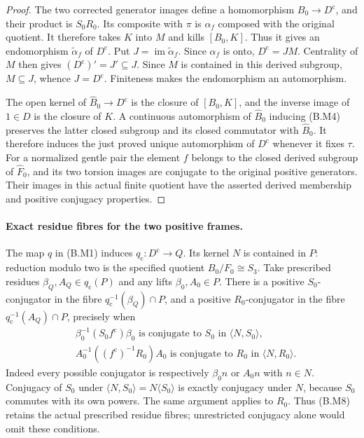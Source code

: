 \begin{proof}
The two corrected generator images define a homomorphism
$B_0\to D^{\mathrm c}$, and their product is $S_0R_0$.
Its composite with $\pi$ is $\alpha_f$ composed with the
original quotient.  It therefore takes $K$ into $M$ and
kills $[B_0,K]$.  Thus it gives an endomorphism $\widetilde
\alpha_f$ of $D^{\mathrm c}$.  Put $J=\operatorname{im}
\widetilde\alpha_f$.  Since $\alpha_f$ is onto,
$D^{\mathrm c}=JM$.  Centrality of $M$ then gives
$(D^{\mathrm c})'=J'\subseteq J$.  Since $M$ is contained
in this derived subgroup, $M\subseteq J$, whence
$J=D^{\mathrm c}$.  Finiteness makes the endomorphism an
automorphism.

The open kernel of $\widehat B_0\to D^{\mathrm c}$ is the
closure of $[B_0,K]$, and the inverse image of $1\in D$ is
the closure of $K$.  A continuous automorphism of
$\widehat B_0$ inducing (B.M4) preserves the latter closed
subgroup and its closed commutator with $\widehat B_0$.
It therefore induces the just proved unique automorphism of
$D^{\mathrm c}$ whenever it fixes $\tau$.  For a normalized
gentle pair the element $f$ belongs to the closed derived
subgroup of $\widehat F_0$, and its two torsion images are
conjugate to the original positive generators.  Their
images in this actual finite quotient have the asserted
derived membership and positive conjugacy properties.
\end{proof}

\paragraph{Exact residue fibres for the two positive frames.}
The map $q$ in (B.M1) induces $q_{\mathrm c}:D^{\mathrm c}
\to Q$.  Its kernel $N$ is contained in $P$: reduction
modulo two is the specified quotient $B_0/F_0\cong S_3$.
Take prescribed residues $\beta_Q,A_Q\in q_{\mathrm c}(P)$
and any lifts $\beta_0,A_0\in P$.  There is a positive
$S_0$-conjugator in the fibre $q_{\mathrm c}^{-1}(\beta_Q)
\cap P$, and a positive $R_0$-conjugator in the fibre
$q_{\mathrm c}^{-1}(A_Q)\cap P$, precisely when
\[
\begin{split}
 &\beta_0^{-1}(S_0 f^{\mathrm c})\beta_0
       \text{ is conjugate to }S_0
       \text{ in }\langle N,S_0\rangle,\\
 &A_0^{-1}((f^{\mathrm c})^{-1}R_0)A_0
       \text{ is conjugate to }R_0
       \text{ in }\langle N,R_0\rangle.         \tag{B.M8}
\end{split}
\]
Indeed every possible conjugator is respectively
$\beta_0n$ or $A_0n$ with $n\in N$.  Conjugacy of $S_0$
under $\langle N,S_0\rangle=N\langle S_0\rangle$ is
exactly conjugacy under $N$, because $S_0$ commutes with
its own powers.  The same argument applies to $R_0$.
Thus (B.M8) retains the actual prescribed residue fibres;
unrestricted conjugacy alone would omit these conditions.


